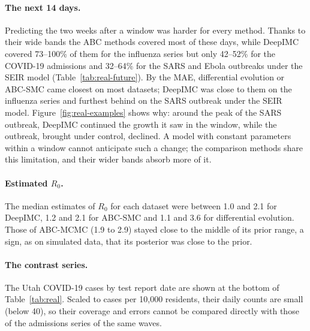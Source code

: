 \documentclass[12pt]{article}
\begin{document}
\paragraph{The next 14 days.} Predicting the two weeks after a window was harder for every method. Thanks to
their wide bands the ABC methods covered most of these days, while DeepIMC covered 73--100\% of them for the
influenza series but only 42--52\% for the COVID-19 admissions and 32--64\% for the SARS and Ebola outbreaks
under the SEIR model (Table~\ref{tab:real-future}). By the MAE, differential evolution or ABC-SMC came
closest on most datasets; DeepIMC was close to them on the influenza series and furthest behind on the SARS
outbreak under the SEIR model. Figure~\ref{fig:real-examples} shows why: around the
peak of the SARS outbreak, DeepIMC continued the growth it saw in the window, while the outbreak, brought
under control, declined. A model with constant parameters within a window cannot anticipate such a change;
the comparison methods share this limitation, and their wider bands absorb more of it.

\paragraph{Estimated $R_0$.} The median estimates of $R_0$ for each dataset were between 1.0 and 2.1 for
DeepIMC, 1.2 and 2.1 for ABC-SMC and 1.1 and 3.6 for differential evolution. Those of ABC-MCMC (1.9 to 2.9)
stayed close to the middle of its prior range, a sign, as on simulated data, that its posterior was close to
the prior.

\paragraph{The contrast series.} The Utah COVID-19 cases by test report date are shown at the bottom of
Table~\ref{tab:real}. Scaled to cases per 10,000 residents, their daily counts are small (below 40), so
their coverage and errors cannot be compared directly with those of the admissions series of the same
waves.

\begin{table}[htbp]
\centering
\caption{Real data: coverage (\%) of the observed daily counts in the window by the 95\% band, and MAE of
the median regenerated curve, mean over the windows of each dataset (number of windows per model in
brackets). Bold: coverage closest to 95\% and lowest MAE. $^\dagger$Contrast series: cases by test report
date, per 10,000 residents.}
\label{tab:real}
\small
\resizebox{\textwidth}{!}{}
\end{table}
\end{document}
